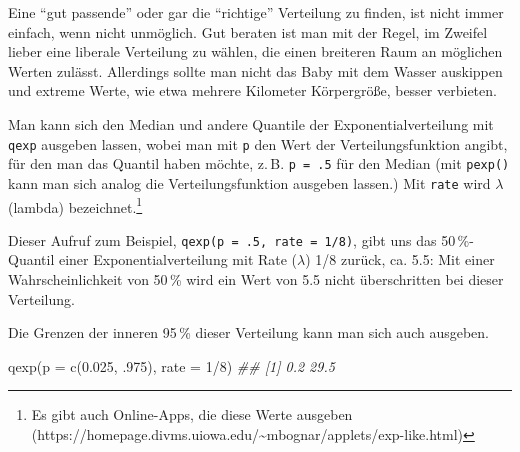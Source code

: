 \documentclass[
  ngerman,
  letterpaper,
  twoside,
  open=any]{scrbook}
\newenvironment{Shaded}{\begin{snugshade}}{\end{snugshade}}
\newcommand{\AttributeTok}[1]{\textcolor[rgb]{0.40,0.45,0.13}{#1}}
\newcommand{\DecValTok}[1]{\textcolor[rgb]{0.68,0.00,0.00}{#1}}
\newcommand{\DocumentationTok}[1]{\textcolor[rgb]{0.37,0.37,0.37}{\textit{#1}}}
\newcommand{\FloatTok}[1]{\textcolor[rgb]{0.68,0.00,0.00}{#1}}
\newcommand{\FunctionTok}[1]{\textcolor[rgb]{0.28,0.35,0.67}{#1}}
\newcommand{\NormalTok}[1]{\textcolor[rgb]{0.00,0.23,0.31}{#1}}
\newcommand{\SpecialCharTok}[1]{\textcolor[rgb]{0.37,0.37,0.37}{#1}}
\theoremstyle{definition}
\theoremstyle{plain}
\theoremstyle{definition}
\theoremstyle{definition}
\theoremstyle{definition}
\theoremstyle{definition}
\theoremstyle{remark}
\begin{document}
\begin{tcolorbox}[enhanced jigsaw, arc=.35mm, bottomrule=.15mm, bottomtitle=1mm, breakable, colback=white, colbacktitle=quarto-callout-note-color!10!white, colframe=quarto-callout-note-color-frame, coltitle=black, left=2mm, leftrule=.75mm, opacityback=0, opacitybacktitle=0.6, rightrule=.15mm, title=\textcolor{quarto-callout-note-color}{\faInfo}\hspace{0.5em}{Hinweis}, titlerule=0mm, toprule=.15mm, toptitle=1mm]

Eine \enquote{gut passende} oder gar die \enquote{richtige} Verteilung
zu finden, ist nicht immer einfach, wenn nicht unmöglich. Gut beraten
ist man mit der Regel, im Zweifel lieber eine liberale Verteilung zu
wählen, die einen breiteren Raum an möglichen Werten zulässt. Allerdings
sollte man nicht das Baby mit dem Wasser auskippen und extreme Werte,
wie etwa mehrere Kilometer Körpergröße, besser verbieten.

\end{tcolorbox}

Man kann sich den Median und andere Quantile der Exponentialverteilung
mit \texttt{qexp} ausgeben lassen, wobei man mit \texttt{p} den Wert der
Verteilungsfunktion angibt, für den man das Quantil haben möchte, z.\,B.
\texttt{p\ =\ .5} für den Median (mit \texttt{pexp()} kann man sich
analog die Verteilungsfunktion ausgeben lassen.) Mit \texttt{rate} wird
\(\lambda\) (lambda) bezeichnet.\footnote{Es gibt auch Online-Apps, die
  diese Werte ausgeben
  (https://homepage.divms.uiowa.edu/\textasciitilde mbognar/applets/exp-like.html)}

Dieser Aufruf zum Beispiel, \texttt{qexp(p\ =\ .5,\ rate\ =\ 1/8)}, gibt
uns das 50\,\%-Quantil einer Exponentialverteilung mit Rate
(\(\lambda\)) 1/8 zurück, ca. 5.5: Mit einer Wahrscheinlichkeit von
50\,\% wird ein Wert von 5.5 nicht überschritten bei dieser Verteilung.

Die Grenzen der inneren 95\,\% dieser Verteilung kann man sich auch
ausgeben.

\begin{Shaded}
\begin{Highlighting}[]
\FunctionTok{qexp}\NormalTok{(}\AttributeTok{p =} \FunctionTok{c}\NormalTok{(}\FloatTok{0.025}\NormalTok{, .}\DecValTok{975}\NormalTok{), }\AttributeTok{rate =} \DecValTok{1}\SpecialCharTok{/}\DecValTok{8}\NormalTok{)}
\DocumentationTok{\#\# [1]  0.2 29.5}
\end{Highlighting}
\end{Shaded}
\end{document}
